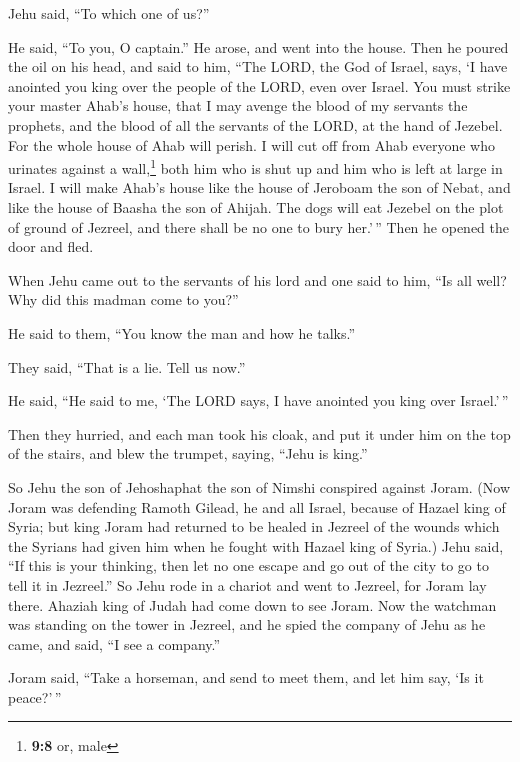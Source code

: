 Jehu said, ``To which one of us?''

He said, ``To you, O captain.''  He arose, and went into
the house. Then he poured the oil on his head, and said to him, ``The
LORD, the God of Israel, says, `I have anointed you king over the people
of the LORD, even over Israel.  You must strike your
master Ahab's house, that I may avenge the blood of my servants the
prophets, and the blood of all the servants of the LORD, at the hand of
Jezebel.  For the whole house of Ahab will perish. I will
cut off from Ahab everyone who urinates against a wall,\footnote{\textbf{9:8}
  or, male} both him who is shut up and him who is left at large in
Israel.  I will make Ahab's house like the house of
Jeroboam the son of Nebat, and like the house of Baasha the son of
Ahijah.  The dogs will eat Jezebel on the plot of ground
of Jezreel, and there shall be no one to bury her.'\,'' Then he opened
the door and fled.

 When Jehu came out to the servants of his lord and one
said to him, ``Is all well? Why did this madman come to you?''

He said to them, ``You know the man and how he talks.''

 They said, ``That is a lie. Tell us now.''

He said, ``He said to me, `The LORD says, I have anointed you king over
Israel.'\,''

 Then they hurried, and each man took his cloak, and put
it under him on the top of the stairs, and blew the trumpet, saying,
``Jehu is king.''

 So Jehu the son of Jehoshaphat the son of Nimshi
conspired against Joram. (Now Joram was defending Ramoth Gilead, he and
all Israel, because of Hazael king of Syria;  but king
Joram had returned to be healed in Jezreel of the wounds which the
Syrians had given him when he fought with Hazael king of Syria.) Jehu
said, ``If this is your thinking, then let no one escape and go out of
the city to go to tell it in Jezreel.''  So Jehu rode in
a chariot and went to Jezreel, for Joram lay there. Ahaziah king of
Judah had come down to see Joram.  Now the watchman was
standing on the tower in Jezreel, and he spied the company of Jehu as he
came, and said, ``I see a company.''

Joram said, ``Take a horseman, and send to meet them, and let him say,
`Is it peace?'\,''

